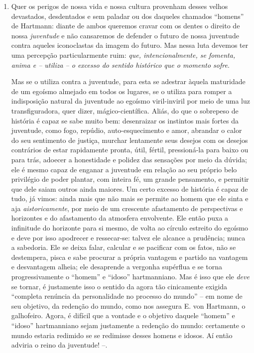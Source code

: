 \begin{enumerate}
\item
  Quer os perigos de nossa vida e nossa cultura provenham desses velhos
  devastados, desdentados e sem paladar ou dos daqueles chamados
  ``homens'' de Hartmann: diante de ambos queremos cravar com os dentes
  o direito de nossa \emph{juventude} e não cansaremos de defender o
  futuro de nossa juventude contra aqueles iconoclastas da imagem do
  futuro. Mas nessa luta devemos ter uma percepção particularmente ruim:
  \emph{que, intencionalmente, se fomenta, anima e -- utiliza -- o
  excesso do sentido histórico que o momento sofre}.

  Mas se o utiliza contra a juventude, para esta se adestrar àquela
  maturidade de um egoísmo almejado em todos os lugares, se o utiliza
  para romper a indisposição natural da juventude ao egoísmo
  viril-inviril por meio de uma luz transfiguradora, quer dizer,
  mágico-científica. Aliás, do que o sobrepeso de história é capaz se
  sabe muito bem: desenraizar os instintos mais fortes da juventude,
  como fogo, repúdio, auto-esquecimento e amor, abrandar o calor do seu
  sentimento de justiça, murchar lentamente seus desejos com os desejos
  contrários de estar rapidamente pronta, útil, fértil, pressioná-la
  para baixo ou para trás, adoecer a honestidade e polidez das sensações
  por meio da dúvida; ele é mesmo capaz de enganar a juventude em
  relação ao seu próprio belo privilégio de poder plantar, com inteira
  fé, um grande pensamento, e permitir que dele saiam outros ainda
  maiores. Um certo excesso de história é capaz de tudo, já vimos: ainda
  mais que não mais se permite ao homem que ele sinta e aja
  \emph{aistoricamente}, por meio de um crescente afastamento de
  perspectivas e horizontes e do afastamento da atmosfera envolvente.
  Ele então puxa a infinitude do horizonte para si mesmo, de volta ao
  círculo estreito do egoísmo e deve por isso apodrecer e ressecar-se:
  talvez ele alcance a prudência; nunca a sabedoria. Ele se deixa falar,
  calcular e se pacificar com os fatos, não se destempera, pisca e sabe
  procurar a própria vantagem e partido na vantagem e desvantagem
  alheia; ele desaprende a vergonha supérflua e se torna
  progressivamente o ``homem'' e ``idoso'' hartmanniano. Mas é isso que
  ele \emph{deve} se tornar, é justamente isso o sentido da agora tão
  cinicamente exigida ``completa renúncia da personalidade no processo
  do mundo'' -- em nome de seu objetivo, da redenção do mundo, como nos
  assegura E. von Hartmann, o galhofeiro. Agora, é difícil que a vontade
  e o objetivo daquele ``homem'' e ``idoso'' hartmanniano sejam
  justamente a redenção do mundo: certamente o mundo estaria redimido se
  se redimisse desses homens e idosos. Aí então adviria o reino da
  juventude! --.
\end{enumerate}


